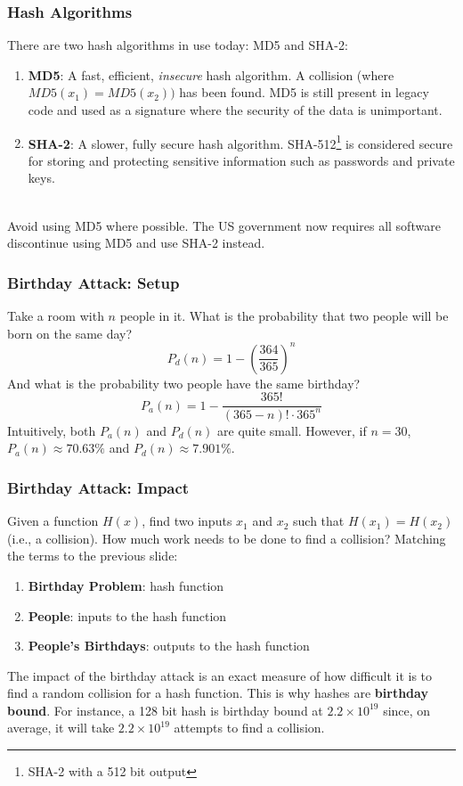\documentclass[aspectratio=169]{beamer}
\begin{document}
\begin{frame}
\frametitle{Hash Algorithms}
There are two hash algorithms in use today: MD5 and SHA-2:
\begin{enumerate}
	\item \textbf{MD5}: A fast, efficient, \emph{insecure} hash algorithm. A collision (where $MD5(x_1) = MD5(x_2))$ has been found. MD5 is still present in legacy code and used as a signature where the security of the data is unimportant.
	\item \textbf{SHA-2}: A slower, fully secure hash algorithm. SHA-512\footnote{SHA-2 with a 512 bit output} is considered secure for storing and protecting sensitive information such as passwords and private keys.
\end{enumerate}

\mbox{}\\
Avoid using MD5 where possible. The US government now requires all software discontinue using MD5 and use SHA-2 instead.
\end{frame}

\begin{frame}
\frametitle{Birthday Attack: Setup}
Take a room with $n$ people in it. What is the probability that two people will be born on the same day?
\[P_d(n) = 1 - \left(\frac {364}{365}\right)^n\]
And what is the probability two people have the same birthday?
\[P_a(n) =  1 - \frac {365!} {(365 - n)! \cdot 365^n}\]
Intuitively, both $P_a(n)$ and $P_d(n)$ are quite small. However, if $n = 30$, $P_a(n) \approx 70.63\%$ and $P_d(n) \approx 7.901\%$.
\end{frame}

\begin{frame}
\frametitle{Birthday Attack: Impact}
Given a function $H(x)$, find two inputs $x_1$ and $x_2$ such that $H(x_1) = H(x_2)$ (i.e., a collision). How much work needs to be done to find a collision? Matching the terms to the previous slide:
\begin{enumerate}
	\item \textbf{Birthday Problem}: hash function
	\item \textbf{People}: inputs to the hash function
	\item \textbf{People's Birthdays}: outputs to the hash function
\end{enumerate}
The impact of the birthday attack is an exact measure of how difficult it is to find a random collision for a hash function. This is why hashes are \textbf{birthday bound}. For instance, a 128 bit hash is birthday bound at $2.2 \times 10^{19}$ since, on average, it will take $2.2 \times 10^{19}$ attempts to find a collision.
\end{frame}
\end{document}
